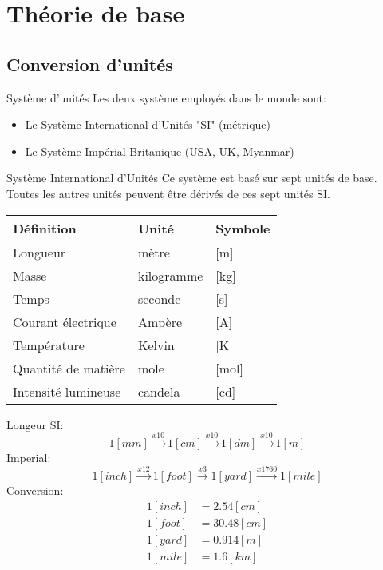 \documentclass[aspectratio=1610,english,12pt]{beamer}
\begin{document}
\section{Théorie de base}

\subsection{Conversion d'unités}

\begin{frame}{Système d'unités}  
	Les deux système employés dans le monde sont:
	\begin{itemize}
		\item Le Système International d'Unités "SI" (métrique)
		\item Le Système Impérial Britanique (USA, UK, Myanmar)
	\end{itemize}
\end{frame}

\begin{frame}{Système International d'Unités}  
	Ce système est basé sur sept unités de base.\\
	Toutes les autres unités peuvent être dérivés de ces sept unités SI.\\
	\vspace{1em}
	\centering
	\begin{tabular}{| l | l | l |}
		\hline
		Définition & Unité & Symbole\\ \hline
		Longueur & mètre & [m]\\
		Masse & kilogramme & [kg]\\
		Temps & seconde & [s]\\
		Courant électrique & Ampère & [A]\\
		Température & Kelvin & [K]\\
		Quantité de matière & mole & [mol]\\
		Intensité lumineuse & candela & [cd]\\
		\hline
	\end{tabular}
\end{frame}

\begin{frame}{Longeur}
	SI:
	\[
		1[mm] \xrightarrow{x10} 1[cm] \xrightarrow{x10} 1[dm] \xrightarrow{x10} 1[m]
	\]
	Imperial:
	\[
		1[inch] \xrightarrow{x12} 1[foot] \xrightarrow{x3} 1[yard] \xrightarrow{x1760} 1[mile]
	\]
	Conversion:
	\begin{align*}
				1[inch] &= 2.54[cm]\\
				1[foot] &= 30.48[cm]\\
				1[yard] &= 0.914[m]\\
				1[mile] &= 1.6[km]
	\end{align*}
\end{frame}
\end{document}
